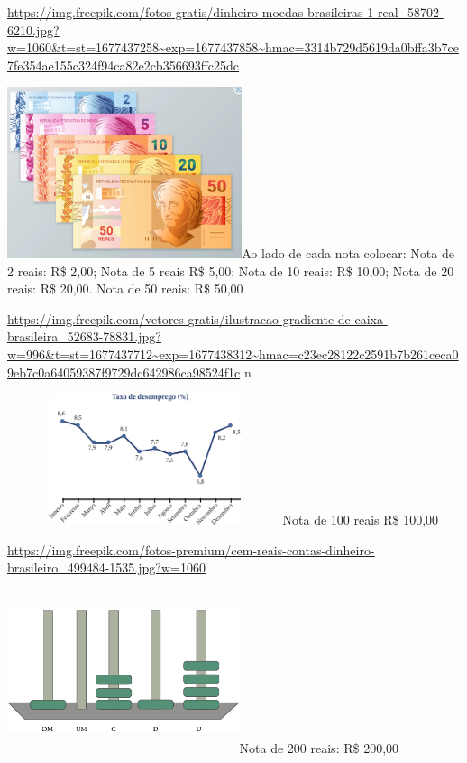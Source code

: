 \url{https://img.freepik.com/fotos-gratis/dinheiro-moedas-brasileiras-1-real_58702-6210.jpg?w=1060\&t=st=1677437258~exp=1677437858~hmac=3314b729d5619da0bffa3b7ce7fe354ae155c324f94ca82e2cb356693ffc25dc}

\includegraphics[width=2.71068in,height=1.97500in]{media/image78.png}Ao
lado de cada nota colocar: Nota de 2 reais: R\$ 2,00; Nota de 5 reais
R\$ 5,00; Nota de 10 reais: R\$ 10,00; Nota de 20 reais: R\$ 20,00. Nota
de 50 reais: R\$ 50,00

\url{https://img.freepik.com/vetores-gratis/ilustracao-gradiente-de-caixa-brasileira_52683-78831.jpg?w=996\&t=st=1677437712~exp=1677438312~hmac=c23ec28122c2591b7b261ceca09eb7c0a64059387f9729dc642986ca98524f1c}
n

\includegraphics[width=3.18285in,height=1.50833in]{media/image79.png}Nota
de 100 reais R\$ 100,00

\url{https://img.freepik.com/fotos-premium/cem-reais-contas-dinheiro-brasileiro_499484-1535.jpg?w=1060}

\includegraphics[width=2.68333in,height=1.88913in]{media/image80.png}Nota
de 200 reais: R\$ 200,00

